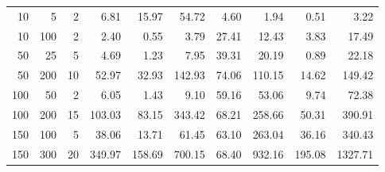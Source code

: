 \begin{tabular}{rrrrrrrrrr}
\toprule
  10 &    5 &   2 &   6.81 &  15.97 &  54.72 &  4.60 &   1.94 &   0.51 &    3.22 \\
  10 &  100 &   2 &   2.40 &   0.55 &   3.79 & 27.41 &  12.43 &   3.83 &   17.49 \\
  50 &   25 &   5 &   4.69 &   1.23 &   7.95 & 39.31 &  20.19 &   0.89 &   22.18 \\
  50 &  200 &  10 &  52.97 &  32.93 & 142.93 & 74.06 & 110.15 &  14.62 &  149.42 \\
 100 &   50 &   2 &   6.05 &   1.43 &   9.10 & 59.16 &  53.06 &   9.74 &   72.38 \\
 100 &  200 &  15 & 103.03 &  83.15 & 343.42 & 68.21 & 258.66 &  50.31 &  390.91 \\
 150 &  100 &   5 &  38.06 &  13.71 &  61.45 & 63.10 & 263.04 &  36.16 &  340.43 \\
 150 &  300 &  20 & 349.97 & 158.69 & 700.15 & 68.40 & 932.16 & 195.08 & 1327.71 \\
\bottomrule
\end{tabular}
